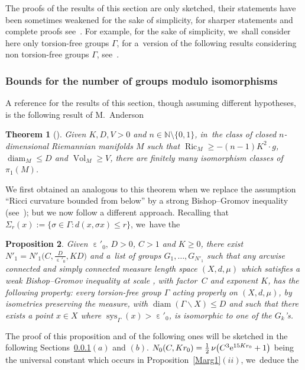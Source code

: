 \documentclass[10pt,a4paper]{amsart}
\numberwithin{equation}{section}
\newtheorem{theor}{Theorem}[section]
\newtheorem{prop}[theor]{Proposition}
\newcommand{\N}{\mathbb{N}}
\newcommand{\Vol}{\operatorname{Vol}}
\newcommand{\Ric}{\operatorname{Ric}}
\newcommand{\sys}{\operatorname{sys}}
\newcommand{\diam}{\operatorname{diam}}
\newcommand{\e}{\operatorname{\varepsilon}}
\begin{document}
The proofs of the results of this section are only sketched, their statements have been sometimes weakened for the sake of simplicity, for sharper
statements and complete proofs see~\cite{BCGS2}. For example, for the sake of simplicity, we~shall consider here only torsion-free groups $\Gamma$, for a~version of the following results considering non torsion-free groups $\Gamma$, see~\cite{BCGS2}.

\subsubsection{Bounds for the number of groups modulo isomorphisms}\label{boundgenerators0}

A reference for the results of this section, though assuming different hypotheses, is the
following result of M.~Anderson

\begin{theor}[{\cite[Theorem~2.3]{An}}]%
Given $K, D, V > 0$ and
$n \in \N \setminus \{0,1\}$, in~the class of closed $n$-dimensional
Riemannian manifolds $M$ such that $\Ric_M \ge -(n-1) K^2\cdot g$, $\diam_M \le D$ and $\Vol_M \ge V$, there are finitely many isomorphism classes
of~$\pi_1 (M)$.
\end{theor}

We first obtained an analogous to this theorem when we replace the assumption ``Ricci curvature bounded from below'' by a strong Bishop--Gromov
inequality (see~\cite{BCGS2}); but we now follow a different approach.
Recalling that $\Sigma_{r} (x) := \{ \sigma \in \Gamma \colon d(x, \sigma x) \le r\}$, we~have the

\begin{prop}\label{majorgroupes1}
Given $\e'_0, \,D >0$, $C > 1 $ and $K\ge 0$, there exist
$N'_1 = N'_1 \big(C, \frac{D}{\e'_0}, K D \big)$ and a~list of groups $G_1,\dots, G_{N'_1}$
such that any arcwise connected and simply connected measure length space
$(X,d,\mu)$ which satisfies a weak Bishop--Gromov inequality at scale
\smash{$\frac{\e'_0}{2}$}, with factor~$C$ and exponent $K$, has the following property: every torsion-free group $\Gamma$ acting properly on $(X,d,\mu)$,
by isometries
preserving the measure, with $\diam (\Gamma \backslash X) \le D$ and such
that there exists a point $x \in X$ where $\sys_\Gamma (x) > \e'_0$, is isomorphic
to one of the $G_k$'s.
\end{prop}

The proof of this proposition and of the following ones will be sketched in the following Sections~\ref{boundgenerators0}$(a)$ and $(b)$.
$N_0 (C, Kr_0)= \frac{1}{2} \,\nu \big(C^3 {\rm e}^{15 K r_0} + 1\big)$ being the universal constant which occurs in Proposition~\ref{Marg1}$(ii)$, we~deduce the
\end{document}
